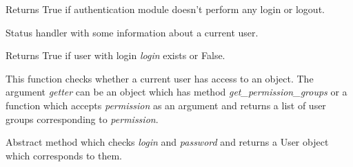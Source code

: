 \documentclass[letterpaper,10pt,english]{sphinxmanual}
\begin{document}
\begin{fulllineitems}
\begin{fulllineitems}
\end{fulllineitems}


\begin{fulllineitems}
\label{sysmod:pyfrid.modules.system.auth.core.auth.BaseAuthModule.noauth}
Returns True if authentication module doesn't perform any login or logout.

\end{fulllineitems}


\begin{fulllineitems}
\label{sysmod:pyfrid.modules.system.auth.core.auth.BaseAuthModule.status}
Status handler with some information about a current user.

\end{fulllineitems}


\begin{fulllineitems}
\label{sysmod:pyfrid.modules.system.auth.core.auth.BaseAuthModule.user_exists}
Returns True if user with login \emph{login} exists or False.

\end{fulllineitems}


\begin{fulllineitems}
\label{sysmod:pyfrid.modules.system.auth.core.auth.BaseAuthModule.validate_access}
This function checks whether a current user has access to an object. The argument \emph{getter} can be an object
which has method \emph{get\_permission\_groups} or a function which accepts \emph{permission} as an argument and returns a list
of user groups corresponding to \emph{permission}.

\end{fulllineitems}


\begin{fulllineitems}
\label{sysmod:pyfrid.modules.system.auth.core.auth.BaseAuthModule.validate_user}
Abstract method which checks \emph{login} and \emph{password} and returns a User object which corresponds to them.

\end{fulllineitems}


\end{fulllineitems}
\end{document}
